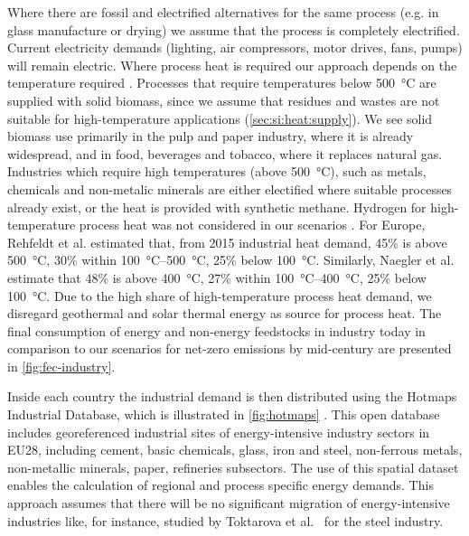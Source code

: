 Where there are fossil and electrified alternatives for the same process (e.g.
in glass manufacture or drying) we assume that the process is completely
electrified. Current electricity demands (lighting, air compressors, motor
drives, fans, pumps) will remain electric. Where process heat is required our
approach depends on the temperature required
.
Processes that require temperatures below \SI{500}{\celsius} are supplied with
solid biomass, since we assume that residues and wastes are not suitable for
high-temperature applications (\cref{sec:si:heat:supply}). We see solid biomass
use primarily in the pulp and paper industry, where it is already widespread,
and in food, beverages and tobacco, where it replaces natural gas. Industries
which require high temperatures (above \SI{500}{\celsius}), such as metals,
chemicals and non-metalic minerals are either electified where suitable
processes already exist, or the heat is provided with synthetic methane.
Hydrogen for high-temperature process heat was not considered in our
scenarios . For Europe, Rehfeldt et al.
 estimated that, from 2015 industrial heat
demand, 45\% is above \SI{500}{\celsius}, 30\% within
\SIrange{100}{500}{\celsius}, 25\% below \SI{100}{\celsius}. Similarly, Naegler
et al.  estimate that 48\% is above
\SI{400}{\celsius}, 27\% within \SIrange{100}{400}{\celsius}, 25\% below
\SI{100}{\celsius}. Due to the high share of high-temperature process heat
demand, we disregard geothermal and solar thermal energy as source for process
heat. The final consumption of energy and non-energy feedstocks in industry
today in comparison to our scenarios for net-zero emissions by mid-century are
presented in \cref{fig:fec-industry}.

Inside each country the industrial demand is then distributed using the Hotmaps
Industrial Database, which is illustrated in \cref{fig:hotmaps} . This open database includes
georeferenced industrial sites of energy-intensive industry sectors in EU28,
including cement, basic chemicals, glass, iron and steel, non-ferrous metals,
non-metallic minerals, paper, refineries subsectors. The use of this spatial
dataset enables the calculation of regional and process specific energy demands.
This approach assumes that there will be no significant migration of
energy-intensive industries like, for instance, studied by Toktarova et
al.~ for the steel industry.

